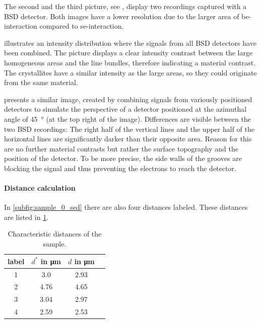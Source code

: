 The second and the third picture, see
, display two
recordings captured with a BSD detector.
Both images have a lower resolution due to the larger area of
\ac{be}-interaction compared to \ac{se}-interaction.

 illustrates an intensity
distribution where the signals from all BSD detectors have been combined.
The picture displays a clear intensity contrast between the large
homogeneous areas and the line bundles, therefore indicating a material
contrast.
The crystallites have a similar intensity as the large areas, so they
could originate from the same material.

 presents a similar image, created by
combining signals from variously positioned detectors to simulate the
perspective of a detector positioned at the azimuthal angle of
\qty{45}{\degree} (at the top right of the image).
Differences are visible between the two BSD recordings: The right
half of the vertical lines and the upper half of the horizontal lines
are significantly darker than their opposite area.
Reason for this are no further material contrasts but rather the surface
topography and the position of the detector.
To be more precise, the side walls of the grooves are blocking the signal and
thus preventing the electrons	to reach the detector.

\paragraph{Distance calculation}
In \cref{subfig:sample_0_sed} there are also four distances labeled.
These distances are listed in \cref{tab:distances}.

\begin{table}[h]
	\centering
	\begin{tabular}{cccc}
		\toprule
		label & $d^*$ in \unit{\micro\meter} & $d$ in \unit{\micro\meter} \\
		\midrule
		1     & \num{3.0}                    & \num{2.93}                 \\
		2     & \num{4.76}                   & \num{4.65}                 \\
		3     & \num{3.04}                   & \num{2.97}                 \\
		4     & \num{2.59}                   & \num{2.53}                 \\
		\bottomrule
	\end{tabular}
	\caption{Characteristic distances of the sample.}
	\label{tab:distances}
\end{table}

